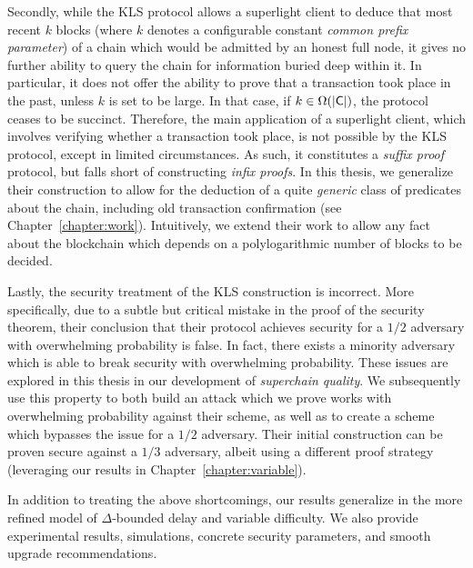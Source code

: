 Secondly, while the KLS protocol allows a superlight client to deduce that most
recent $k$ blocks (where $k$ denotes a configurable constant \emph{common prefix
parameter}) of a chain which would be admitted by an honest full node, it gives
no further ability to query the chain for information buried deep within it. In
particular, it does not offer the ability to prove that a transaction took place
in the past, unless $k$ is set to be large. In that case, if
$k \in \Omega(|\mathsf{C}|)$, the protocol ceases to be succinct. Therefore, the
main application of a superlight client, which involves verifying whether a
transaction took place, is not possible by the KLS protocol, except in limited
circumstances. As such, it constitutes a \emph{suffix proof} protocol, but falls
short of constructing \emph{infix proofs}. In this thesis, we generalize their
construction to allow for the deduction of a quite \emph{generic} class of
predicates about the chain, including old transaction confirmation (see
Chapter~\ref{chapter:work}). Intuitively,
we extend their work to allow any fact about the blockchain which depends on a
polylogarithmic number of blocks to be decided.

Lastly, the security treatment of the KLS construction is incorrect. More
specifically, due to a subtle but critical mistake in the proof of the security
theorem, their conclusion that their protocol achieves security for a $1/2$
adversary with overwhelming probability is false. In fact, there exists a
minority adversary which is able to break security with overwhelming
probability. These issues are explored in this thesis in our development of
\emph{superchain quality}. We subsequently use this property to both build an
attack which we prove works with overwhelming probability against their scheme,
as well as to create a scheme which bypasses the issue for a $1/2$ adversary.
Their initial construction can be proven secure against a $1/3$ adversary,
albeit using a different proof strategy (leveraging our results in
Chapter~\ref{chapter:variable}).

In addition to treating the above shortcomings, our results generalize in the
more refined model of $\Delta$-bounded delay and variable difficulty. We also
provide experimental results, simulations, concrete security parameters, and
smooth upgrade recommendations.

